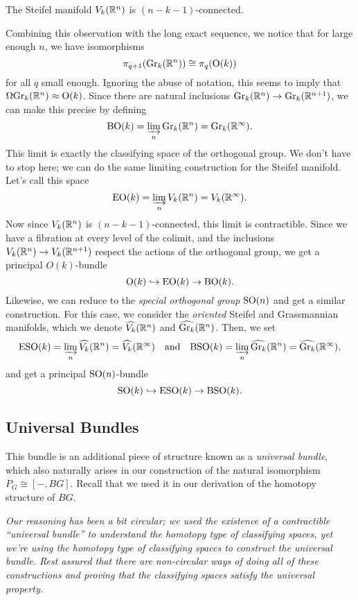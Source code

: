\documentclass{article}
\begin{document}
\begin{proposition}
  The Steifel manifold $V_k(\mathbb{R}^n)$ is $(n-k-1)$-connected. 
\end{proposition}

Combining this observation with the long exact sequence, we notice that for large enough $n$, we have isomorphisms 
\[
  \pi_{q+1}(\mathrm{Gr}_k(\mathbb{R}^n)) \cong \pi_q(\mathrm{O}(k))
\]
for all $q$ small enough. Ignoring the abuse of notation, this seems to imply that $\Omega \mathrm{Gr}_k(\mathbb{R}^n) \approx \mathrm{O}(k)$. Since there are natural inclusions $\mathrm{Gr}_k(\mathbb{R}^n) \to \mathrm{Gr}_k(\mathbb{R}^{n+1})$, we can make this precise by defining
\[
  \mathrm{BO}(k) = \varinjlim_n \mathrm{Gr}_k(\mathbb{R}^n) = \mathrm{Gr}_k(\mathbb{R}^\infty).
\]
This limit is exactly the classifying space of the orthogonal group. We don't have to stop here; we can do the same limiting construction for the Steifel manifold. Let's call this space
\[
  \mathrm{EO}(k) = \varinjlim_n V_k(\mathbb{R}^n) = V_k(\mathbb{R}^\infty).
\]
Now since $V_k(\mathbb{R}^n)$ is $(n-k-1)$-connected, this limit is contractible. Since we have a fibration at every level of the colimit, and the inclusions $V_k(\mathbb{R}^n) \to V_k(\mathbb{R}^{n+1})$ respect the actions of the orthogonal group, we get a principal $O(k)$-bundle
\[ \mathrm{O}(k) \hookrightarrow \mathrm{EO}(k) \to \mathrm{BO}(k).\]
Likewise, we can reduce to the \emph{special orthogonal group} $\mathrm{SO}(n)$ and get a similar construction. For this case, we consider the \emph{oriented} Steifel and Grassmannian manifolds, which we denote $\widehat{V_k}(\mathbb{R}^n)$ and $\widehat{\mathrm{Gr}_k}(\mathbb{R}^n)$. Then, we set
\[
  \mathrm{ESO}(k) = \varinjlim_n \widehat{V_k}(\mathbb{R}^n) = \widehat{V_k}(\mathbb{R}^\infty)\quad\textrm{and}\quad \mathrm{BSO}(k)=\varinjlim_n \widehat{\mathrm{Gr}_k}(\mathbb{R}^n) = \widehat{\mathrm{Gr}_k}(\mathbb{R}^\infty),
\]
and get a principal $\mathrm{SO}(n)$-bundle
\[
  \mathrm{SO}(k) \hookrightarrow \mathrm{ESO}(k) \to \mathrm{BSO}(k).
\]
\subsection{Universal Bundles}

This bundle is an additional piece of structure known as a \emph{universal bundle}, which also naturally arises in our construction of the natural isomorphism $P_G \cong [-, BG]$. Recall that we used it in our derivation of the homotopy structure of $BG$.

\begin{remark}
  \emph{Our reasoning has been a bit circular; we used the existence of a contractible ``universal bundle'' to understand the homotopy type of classifying spaces, yet we're using the homotopy type of classifying spaces to construct the universal bundle. Rest assured that there are non-circular ways of doing all of these constructions and proving that the classifying spaces satisfy the universal property.}
\end{remark}
\end{document}
